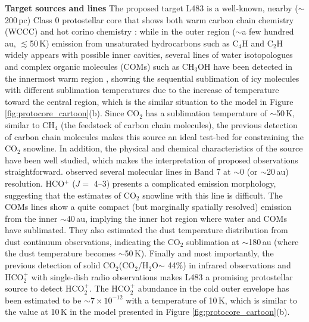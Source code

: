 \documentclass[12pt,a4paper]{article}  %
\newcommand{\carbondioxide}{CO$_2$\xspace}
\newcommand{\protonatedcarbondioxide}{HCO$_2^+$\xspace}
\newcommand{\water}{H$_2$O\xspace}
\begin{document}
\noindent \textbf{Target sources and lines} \quad The proposed target L483 is a well-known, nearby ($\sim$200\,pc) Class 0 protostellar core that shows both warm carbon chain chemistry (WCCC) and hot corino chemistry \citep[Figure \ref{fig:prev_obs},][]{Oya17}: while in the outer region ($\sim$a few hundred au, $\lesssim$50\,K) emission from unsaturated hydrocarbons such as C$_4$H and C$_2$H widely appears with possible inner cavities, several lines of water isotopologues and complex organic molecules (COMs) such as CH$_3$OH have been detected in the innermost warm region \citep[$\lesssim$100\,au, $\gtrsim$100\,K, see also][]{Jensen19, Jensen21}, showing the sequential sublimation of icy molecules with different sublimation temperatures due to the increase of temperature toward the central region, which is the similar situation to the model in Figure \ref{fig:protocore_cartoon}(b). Since \carbondioxide has a sublimation temperature of $\sim$50\,K, similar to CH$_4$ (the feedstock of carbon chain molecules), the previous detection of carbon chain molecules makes this source an ideal test-bed for constraining the \carbondioxide snowline. In addition, the physical and chemical characteristics of the source have been well studied, which makes the interpretation of proposed observations straightforward. \citet{Jacobsen19} observed several molecular lines in Band 7 at $\sim$0 (or $\sim$20\,au) resolution. HCO$^+$ ($J=$ 4--3) presents a complicated emission morphology, suggesting that the estimates of \carbondioxide snowline with this line is difficult. The COMs lines show a quite compact (but marginally spatially resolved) emission from the inner $\sim$40\,au, implying the inner hot region where water and COMs have sublimated. They also estimated the dust temperature distribution from dust continuum observations, indicating the \carbondioxide sublimation at $\sim$180\,au (where the dust temperature becomes $\sim$50\,K).  Finally and most importantly, the previous detection of solid \carbondioxide (\carbondioxide/\water $\sim$ 44\%) in infrared observations \citep{Boogert11} and \protonatedcarbondioxide with single-dish radio observations \citep{Agundez19} makes L483 a promising protostellar source to detect \protonatedcarbondioxide. %
The \protonatedcarbondioxide abundance in the cold outer envelope has been estimated to be $\sim7\times10^{-12}$ with a temperature of 10\,K, which is similar to the value at 10\,K in the model presented in Figure \ref{fig:protocore_cartoon}(b).%
\end{document}

